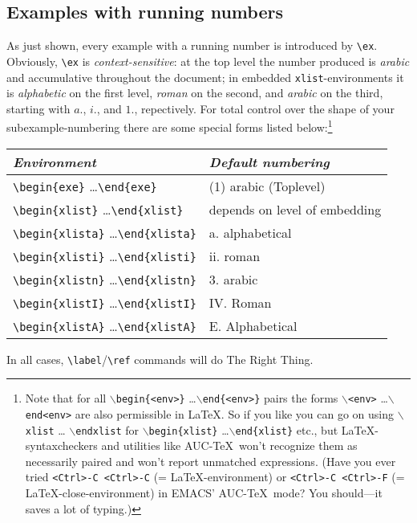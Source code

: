 \documentclass[11pt,a4paper]{article}
\def\bs{$\backslash$}
\begin{document}
\subsection{Examples with running numbers}
As just shown, every example with a running number
is introduced by \verb'\ex'.
Obviously, \verb,\ex, is {\em context-sensitive\/}: at the top
level the number produced is {\em arabic} and accumulative
throughout the document; in embedded {\tt xlist}-environments it is
{\em alphabetic\/} on the first level, {\em roman\/} on the second, and
{\em arabic\/} on the third, starting with $a.$, $i.$, and $1.$,
repectively. For total control over the shape
of your subexample-numbering there are some special forms listed
below:\footnote{%
Note that for all
{\tt \bs begin\{<env>\}} \ldots {\tt \bs end\{<env>\}} pairs the forms
{\tt \bs<env>} \ldots {\tt \bs end<env>} are also permissible in \LaTeX.
So if you like you can go on using {\tt\bs xlist} \ldots
{\tt\bs endxlist} for {\tt \bs begin\{xlist\}} \ldots {\tt \bs end\{xlist\}}
 etc., but \LaTeX-syntaxcheckers and utilities like AUC-\TeX\ won't
recognize them as necessarily paired and won't report unmatched
 expressions. (Have you ever tried {\tt <Ctrl>-C <Ctrl>-C}
 (= LaTeX-environment) or {\tt <Ctrl>-C <Ctrl>-F}
 (= LaTeX-close-environment) in EMACS' AUC-\TeX\  mode? You should---it
saves a lot of typing.)}
\begin{center}
\begin{tabular}{|l|l|}\hline
{\em Environment}& {\em Default numbering}\\ \hline\hline
\verb,\begin{exe}, \ldots \verb,\end{exe},& (1) arabic 
(Toplevel)\\ \hline\hline
\verb,\begin{xlist}, \ldots \verb,\end{xlist},& depends on level of
embedding\\ \hline
\verb,\begin{xlista}, \ldots \verb,\end{xlista},& a. alphabetical\\
\verb,\begin{xlisti}, \ldots \verb,\end{xlisti},& ii. roman\\
\verb,\begin{xlistn}, \ldots \verb,\end{xlistn},& 3. arabic\\
\verb,\begin{xlistI}, \ldots \verb,\end{xlistI},& IV. Roman\\
\verb,\begin{xlistA}, \ldots \verb,\end{xlistA},& E. Alphabetical\\ \hline
\end{tabular}
\end{center}
In all cases, \verb,\label,/\verb,\ref, commands will do The Right
Thing.
\end{document}
